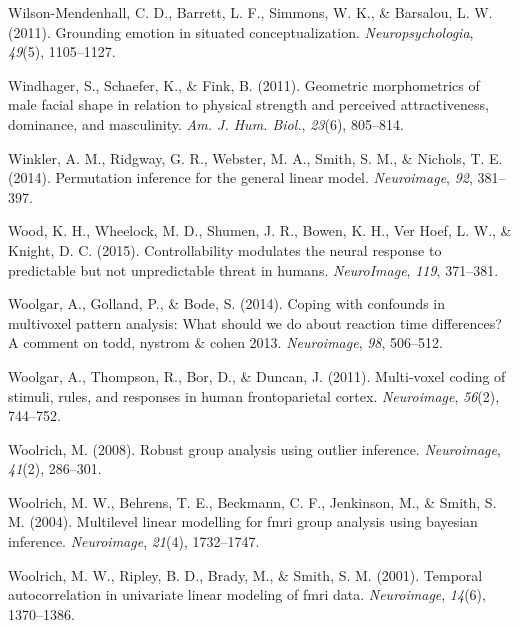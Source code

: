 \documentclass[11pt,american,a4paper,oneside,]{memoir} %
\begin{document}
\leavevmode\hypertarget{ref-wilson2011grounding}{}%
Wilson-Mendenhall, C. D., Barrett, L. F., Simmons, W. K., \& Barsalou, L. W. (2011). Grounding emotion in situated conceptualization. \emph{Neuropsychologia}, \emph{49}(5), 1105--1127.

\leavevmode\hypertarget{ref-Windhager2011-ik}{}%
Windhager, S., Schaefer, K., \& Fink, B. (2011). Geometric morphometrics of male facial shape in relation to physical strength and perceived attractiveness, dominance, and masculinity. \emph{Am. J. Hum. Biol.}, \emph{23}(6), 805--814.

\leavevmode\hypertarget{ref-winkler2014permutation}{}%
Winkler, A. M., Ridgway, G. R., Webster, M. A., Smith, S. M., \& Nichols, T. E. (2014). Permutation inference for the general linear model. \emph{Neuroimage}, \emph{92}, 381--397.

\leavevmode\hypertarget{ref-wood2015controllability}{}%
Wood, K. H., Wheelock, M. D., Shumen, J. R., Bowen, K. H., Ver Hoef, L. W., \& Knight, D. C. (2015). Controllability modulates the neural response to predictable but not unpredictable threat in humans. \emph{NeuroImage}, \emph{119}, 371--381.

\leavevmode\hypertarget{ref-Woolgar2014-jb}{}%
Woolgar, A., Golland, P., \& Bode, S. (2014). Coping with confounds in multivoxel pattern analysis: What should we do about reaction time differences? A comment on todd, nystrom \& cohen 2013. \emph{Neuroimage}, \emph{98}, 506--512.

\leavevmode\hypertarget{ref-woolgar2011multi}{}%
Woolgar, A., Thompson, R., Bor, D., \& Duncan, J. (2011). Multi-voxel coding of stimuli, rules, and responses in human frontoparietal cortex. \emph{Neuroimage}, \emph{56}(2), 744--752.

\leavevmode\hypertarget{ref-woolrich2008robust}{}%
Woolrich, M. (2008). Robust group analysis using outlier inference. \emph{Neuroimage}, \emph{41}(2), 286--301.

\leavevmode\hypertarget{ref-woolrich2004multilevel}{}%
Woolrich, M. W., Behrens, T. E., Beckmann, C. F., Jenkinson, M., \& Smith, S. M. (2004). Multilevel linear modelling for fmri group analysis using bayesian inference. \emph{Neuroimage}, \emph{21}(4), 1732--1747.

\leavevmode\hypertarget{ref-woolrich2001temporal}{}%
Woolrich, M. W., Ripley, B. D., Brady, M., \& Smith, S. M. (2001). Temporal autocorrelation in univariate linear modeling of fmri data. \emph{Neuroimage}, \emph{14}(6), 1370--1386.
\end{document}
